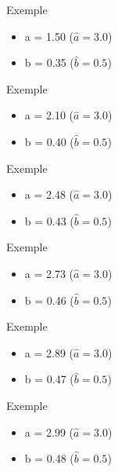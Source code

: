 \begin{frame}{Exemple}
  \begin{itemize}
    \item a = 1.50 ($\hat{a} = 3.0$)
    \item b = 0.35 ($\hat{b} = 0.5$)
  \end{itemize}
\end{frame}

\begin{frame}{Exemple}
  \begin{itemize}
    \item a = 2.10 ($\hat{a} = 3.0$)
    \item b = 0.40 ($\hat{b} = 0.5$)
  \end{itemize}
\end{frame}

\begin{frame}{Exemple}
  \begin{itemize}
    \item a = 2.48 ($\hat{a} = 3.0$)
    \item b = 0.43 ($\hat{b} = 0.5$)
  \end{itemize}
\end{frame}

\begin{frame}{Exemple}
  \begin{itemize}
    \item a = 2.73 ($\hat{a} = 3.0$)
    \item b = 0.46 ($\hat{b} = 0.5$)
  \end{itemize}
\end{frame}

\begin{frame}{Exemple}
  \begin{itemize}
    \item a = 2.89 ($\hat{a} = 3.0$)
    \item b = 0.47 ($\hat{b} = 0.5$)
  \end{itemize}
\end{frame}

\begin{frame}{Exemple}
  \begin{itemize}
    \item a = 2.99 ($\hat{a} = 3.0$)
    \item b = 0.48 ($\hat{b} = 0.5$)
  \end{itemize}
\end{frame}

